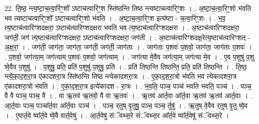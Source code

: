 \documentclass[17pt]{extarticle}
\begin{document}
22. ति॒ष्ठ॒ न्त्य॒ष्टा॒च॒त्वा॒रिꣳ॒॒शो᳚ ऽष्टाचत्वारिꣳ॒॒श स्ति॑ष्ठन्ति तिष्ठ न्त्यष्टाचत्वारिꣳ॒॒शः । . अ॒ष्टा॒च॒त्वा॒रिꣳ॒॒शो भ॑वति भव त्यष्टाचत्वारिꣳ॒॒शो᳚ ऽष्टाचत्वारिꣳ॒॒शो भ॑वति । . अ॒ष्टा॒च॒त्वा॒रिꣳ॒॒श इत्य॑ष्टा - च॒त्वा॒रिꣳ॒॒शः । . भ॒व॒ त्य॒ष्टाच॑त्वारिꣳशदक्षरा॒ ऽष्टाच॑त्वारिꣳशदक्षरा भवति भव त्य॒ष्टाच॑त्वारिꣳशदक्षरा । . अ॒ष्टाच॑त्वारिꣳशदक्षरा॒ जग॑ती॒ जग॑ त्य॒ष्टाच॑त्वारिꣳशदक्षरा॒ ऽष्टाच॑त्वारिꣳशदक्षरा॒ जग॑ती । . अ॒ष्टाच॑त्वारिꣳशदक्ष॒रेत्य॒ष्टाच॑त्वारिꣳशत् - अ॒क्ष॒रा॒ । . जग॑ती॒ जाग॑ता॒ जाग॑ता॒ जग॑ती॒ जग॑ती॒ जाग॑ताः । . जाग॑ताः प॒शवः॑ प॒शवो॒ जाग॑ता॒ जाग॑ताः प॒शवः॑ । . प॒शवो॒ जग॑त्या॒म् जग॑त्याम् प॒शवः॑ प॒शवो॒ जग॑त्याम् । . जग॑त्या मे॒वैव जग॑त्या॒म् जग॑त्या मे॒व । . ए॒व प॒शुषु॑ प॒शु ष्वे॒वैव प॒शुषु॑ । . प॒शुषु॒ प्रति॒ प्रति॑ प॒शुषु॑ प॒शुषु॒ प्रति॑ । . प्रति॑ तिष्ठन्ति तिष्ठन्ति॒ प्रति॒ प्रति॑ तिष्ठन्ति । . ति॒ष्ठ॒ न्त्ये॒का॒द॒श॒रा॒त्र ए॑कादशरा॒त्र स्ति॑ष्ठन्ति तिष्ठ न्त्येकादशरा॒त्रः । . ए॒का॒द॒श॒रा॒त्रो भ॑वति भव त्येकादशरा॒त्र ए॑कादशरा॒त्रो भ॑वति । . ए॒का॒द॒श॒रा॒त्र इत्ये॑कादश - रा॒त्रः । . भ॒व॒ति॒ पञ्च॒ पञ्च॑ भवति भवति॒ पञ्च॑ । . पञ्च॒ वै वै पञ्च॒ पञ्च॒ वै । . वा ऋ॒तव॑ ऋ॒तवो॒ वै वा ऋ॒तवः॑ । . ऋ॒तव॑ आर्त॒वा आ᳚र्त॒वा ऋ॒तव॑ ऋ॒तव॑ आर्त॒वाः । . आ॒र्त॒वाः पञ्च॒ पञ्चा᳚र्त॒वा आ᳚र्त॒वाः पञ्च॑ । . पञ्च॒ र्‌तुष् वृ॒तुषु॒ पञ्च॒ पञ्च॒ र्तुषु॑ । . ऋ॒तुष् वे॒वैव र्‌तुष् वृ॒तु ष्वे॒व । . ए॒वार्त॒वे ष्वा᳚र्त॒वे ष्वे॒वै वार्त॒वेषु॑ । . आ॒र्त॒वेषु॑ संॅवथ्स॒रे सं॑ॅवथ्स॒र आ᳚र्त॒वे ष्वा᳚र्त॒वेषु॑ संॅवथ्स॒रे । \newline
\end{document}
